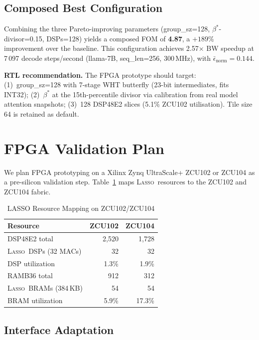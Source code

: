 \documentclass[conference]{IEEEtran}
\newcommand{\lasso}{\textsc{Lasso}}
\begin{document}
\subsection{Composed Best Configuration}

Combining the three Pareto-improving parameters (group\_sz=128,
$\beta^*$\!-divisor=0.15, DSPs=128) yields a composed FOM of \textbf{4.87},
a $+189\%$ improvement over the baseline.  This configuration achieves
2.57$\times$ BW speedup at 7\,097 decode steps/second (llama-7B,
seq\_len=256, 300\,MHz), with $\bar\epsilon_\text{norm}=0.144$.

\textbf{RTL recommendation.}  The FPGA prototype should target:
(1)~group\_sz=128 with 7-stage WHT butterfly (23-bit intermediates,
fits INT32); (2)~$\beta^*$ at the 15th-percentile divisor via
calibration from real model attention snapshots; (3)~128 DSP48E2 slices
(5.1\% ZCU102 utilisation).  Tile size 64 is retained as default.

\section{FPGA Validation Plan}
\label{sec:fpga}

We plan FPGA prototyping on a Xilinx Zynq UltraScale+ ZCU102 or
ZCU104 as a pre-silicon validation step. Table~\ref{tab:fpga} maps
\lasso\ resources to the ZCU102 and ZCU104 fabric.

\begin{table}[t]
\caption{LASSO Resource Mapping on ZCU102/ZCU104}
\label{tab:fpga}
\centering
\begin{tabular}{lrr}
\toprule
Resource & ZCU102 & ZCU104 \\
\midrule
DSP48E2 total & 2,520 & 1,728 \\
\lasso\ DSPs (32 MACs) & 32 & 32 \\
DSP utilization & 1.3\% & 1.9\% \\
\midrule
RAMB36 total & 912 & 312 \\
\lasso\ BRAMs (384\,KB) & 54 & 54 \\
BRAM utilization & 5.9\% & 17.3\% \\
\midrule
\end{tabular}
\end{table}

\subsection{Interface Adaptation}
\end{document}
